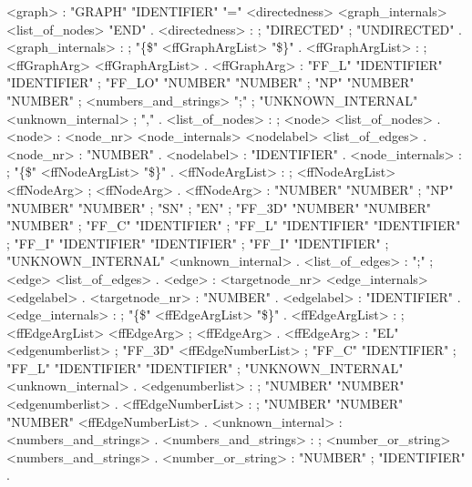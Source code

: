 \begin{grammar}
  <graph> : "GRAPH" "IDENTIFIER" "=" <directedness> <graph\_internals> <list\_of\_nodes> "END" 
     .
  <directedness> : 
     ; "DIRECTED" 
     ; "UNDIRECTED" 
     .
  <graph\_internals> : 
     ; "\{\$" <ffGraphArgList> "\$\}" 
     .
  <ffGraphArgList> : 
     ; <ffGraphArg> <ffGraphArgList> 
     .
  <ffGraphArg> : "FF\_L" "IDENTIFIER" "IDENTIFIER" 
     ; "FF\_LO" "NUMBER" "NUMBER" 
     ; "NP" "NUMBER" "NUMBER" 
     ; <numbers\_and\_strings> ";" 
     ; "UNKNOWN\_INTERNAL" <unknown\_internal> 
     ; "," 
     .
  <list\_of\_nodes> : 
     ; <node> <list\_of\_nodes> 
     .
  <node> : <node\_nr> <node\_internals> <nodelabel> <list\_of\_edges> 
     .
  <node\_nr> : "NUMBER" 
     .
  <nodelabel> : "IDENTIFIER" 
     .
  <node\_internals> : 
     ; "\{\$" <ffNodeArgList> "\$\}" 
     .
  <ffNodeArgList> : 
     ; <ffNodeArgList> <ffNodeArg> 
     ; <ffNodeArg> 
     .
  <ffNodeArg> : "NUMBER" "NUMBER" 
     ; "NP" "NUMBER" "NUMBER" 
     ; "SN" 
     ; "EN" 
     ; "FF\_3D" "NUMBER" "NUMBER" "NUMBER" 
     ; "FF\_C" "IDENTIFIER" 
     ; "FF\_L" "IDENTIFIER" "IDENTIFIER" 
     ; "FF\_I" "IDENTIFIER" "IDENTIFIER" 
     ; "FF\_I" "IDENTIFIER" 
     ; "UNKNOWN\_INTERNAL" <unknown\_internal> 
     .
  <list\_of\_edges> : ";" 
     ; <edge> <list\_of\_edges> 
     .
  <edge> : <targetnode\_nr> <edge\_internals> <edgelabel> 
     .
  <targetnode\_nr> : "NUMBER" 
     .
  <edgelabel> : "IDENTIFIER" 
     .
  <edge\_internals> : 
     ; "\{\$" <ffEdgeArgList> "\$\}" 
     .
  <ffEdgeArgList> : 
     ; <ffEdgeArgList> <ffEdgeArg> 
     ; <ffEdgeArg> 
     .
  <ffEdgeArg> : "EL" <edgenumberlist> 
     ; "FF\_3D" <ffEdgeNumberList> 
     ; "FF\_C" "IDENTIFIER" 
     ; "FF\_L" "IDENTIFIER" "IDENTIFIER" 
     ; "UNKNOWN\_INTERNAL" <unknown\_internal> 
     .
  <edgenumberlist> : 
     ; "NUMBER" "NUMBER" <edgenumberlist> 
     .
  <ffEdgeNumberList> : 
     ; "NUMBER" "NUMBER" "NUMBER" <ffEdgeNumberList> 
     .
  <unknown\_internal> : <numbers\_and\_strings> 
     .
  <numbers\_and\_strings> : 
     ; <number\_or\_string> <numbers\_and\_strings> 
     .
  <number\_or\_string> : "NUMBER" 
     ; "IDENTIFIER" 
     .
\end{grammar}

